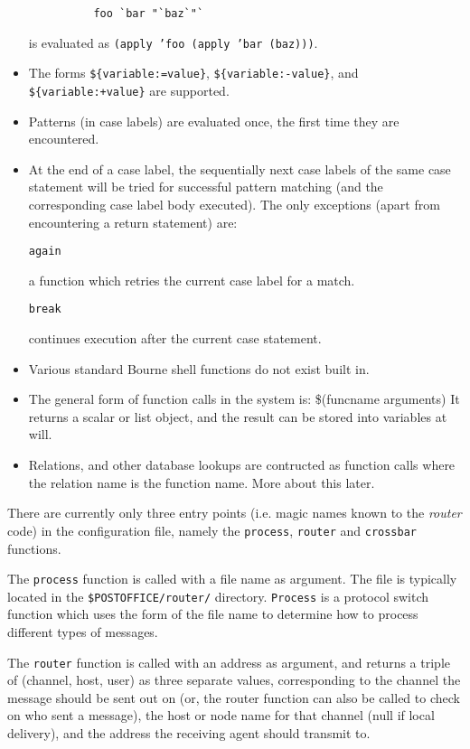 \begin{itemize}
\begin{tscreen}
\begin{verbatim}
          foo `bar "`baz`"`
\end{verbatim}
\end{tscreen}

     
is evaluated as {\tt (apply 'foo (apply 'bar (baz)))}.
\item  The forms {\tt \$\{variable:=value\}}, 
{\tt \$\{variable:-value\}}, and
{\tt \$\{variable:+value\}} are supported.  
\item  Patterns (in case labels) are evaluated once, the first time they are
encountered.
\item  At the end of a case label, the sequentially next case labels of the
same case statement will be tried for successful pattern matching (and
the corresponding case label body executed). The only exceptions
(apart from encountering a return statement) are:

{\tt again}     

a function which retries the current case label for a match.

{\tt break}     

continues execution after the current case statement.
\item  Various standard Bourne shell functions do not exist built in.
\item  The general form of function calls in the system is:
\$(funcname arguments)
It returns a scalar or list object, and the result can be stored
into variables at will.
\item  Relations, and other database lookups are contructed as function calls
where the relation name is the function name.  More about this later.
\end{itemize}


There are currently only three entry points (i.e. magic names known to the
{\em router\/} code) in the configuration file, namely the {\tt process}, {\tt router} and 
{\tt crossbar} functions.

The {\tt process} function is called with a file name as argument. 
The file is typically located in the {\tt \$POSTOFFICE/router/} 
directory. {\tt Process} is a protocol switch function which uses the 
form of the file name to determine how to process different types of 
messages.

The {\tt router} function is called with an address as argument, and returns a
triple of (channel, host, user) as three separate values, corresponding to
the channel the message should be sent out on (or, the router function can
also be called to check on who sent a message), the host or node name for
that channel (null if local delivery), and the address the receiving agent
should transmit to.

